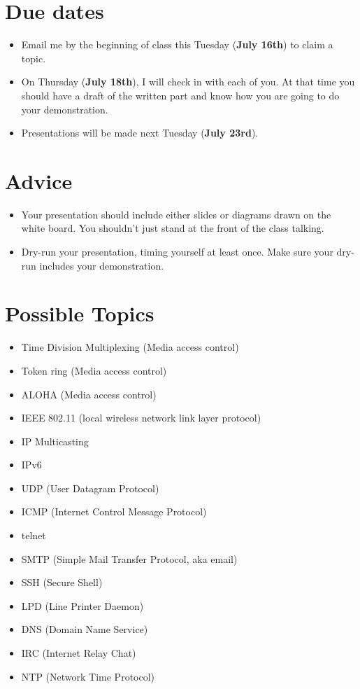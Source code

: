 \documentclass{article}
\begin{document}
\section{Due dates}
\begin{itemize}
\item Email me by the beginning of class this Tuesday ({\bf July 16th}) to claim a topic.

\item On Thursday ({\bf July 18th}), I will check in with each of you.  At that time you should have a draft of the written part and know how you are going to do your demonstration.

\item Presentations will be made next Tuesday ({\bf July 23rd}).

\end{itemize}

\section{Advice}
\begin{itemize}
\item Your presentation should include either slides or diagrams drawn on the white board.  You shouldn't just stand at the front of the class talking.
\item Dry-run your presentation, timing yourself at least once.  Make sure your dry-run includes your demonstration.
\end{itemize}

\section{Possible Topics}
\begin{itemize}
\item Time Division Multiplexing (Media access control)
\item Token ring (Media access control)
\item ALOHA (Media access control)
\item IEEE 802.11 (local wireless network link layer protocol)
\item IP Multicasting
\item IPv6
\item UDP (User Datagram Protocol)
\item ICMP (Internet Control Message Protocol)
\item telnet
\item SMTP (Simple Mail Transfer Protocol, aka email)
\item SSH (Secure Shell)
\item LPD (Line Printer Daemon)
\item DNS (Domain Name Service)
\item IRC (Internet Relay Chat)
\item NTP (Network Time Protocol)
\end{itemize}
\end{document}
